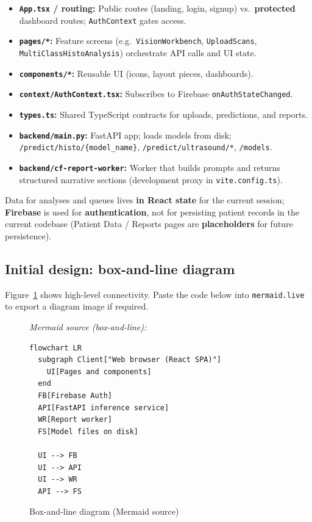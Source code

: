 \documentclass[12pt,a4paper]{report}
\begin{document}
\begin{itemize}
  \item \textbf{\texttt{App.tsx} / routing:} Public routes (landing, login, signup) vs.\ \textbf{protected} dashboard routes; \texttt{AuthContext} gates access.
  \item \textbf{\texttt{pages/*}:} Feature screens (e.g.\ \texttt{VisionWorkbench}, \texttt{UploadScans}, \texttt{MultiClassHistoAnalysis}) orchestrate API calls and UI state.
  \item \textbf{\texttt{components/*}:} Reusable UI (icons, layout pieces, dashboards).
  \item \textbf{\texttt{context/AuthContext.tsx}:} Subscribes to Firebase \texttt{onAuthStateChanged}.
  \item \textbf{\texttt{types.ts}:} Shared TypeScript contracts for uploads, predictions, and reports.
  \item \textbf{\texttt{backend/main.py}:} FastAPI app; loads models from disk; \texttt{/predict/histo/\{model\_name\}}, \texttt{/predict/ultrasound/*}, \texttt{/models}.
  \item \textbf{\texttt{backend/cf-report-worker}:} Worker that builds prompts and returns structured narrative sections (development proxy in \texttt{vite.config.ts}).
\end{itemize}

Data for analyses and queues lives \textbf{in React state} for the current session; \textbf{Firebase} is used for \textbf{authentication}, not for persisting patient records in the current codebase (Patient Data / Reports pages are \textbf{placeholders} for future persistence).

\subsection{Initial design: box-and-line diagram}

Figure~\ref{fig:box-line} shows high-level connectivity. Paste the code below into \texttt{mermaid.live} to export a diagram image if required.

\begin{figure}[htbp]
  \centering
  {\small\textit{Mermaid source (box-and-line):}}
  \vspace{0.5em}
  \begin{verbatim}
flowchart LR
  subgraph Client["Web browser (React SPA)"]
    UI[Pages and components]
  end
  FB[Firebase Auth]
  API[FastAPI inference service]
  WR[Report worker]
  FS[Model files on disk]

  UI --> FB
  UI --> API
  UI --> WR
  API --> FS
  \end{verbatim}
  \caption{Box-and-line diagram (Mermaid source)}
  \label{fig:box-line}
\end{figure}
\end{document}
